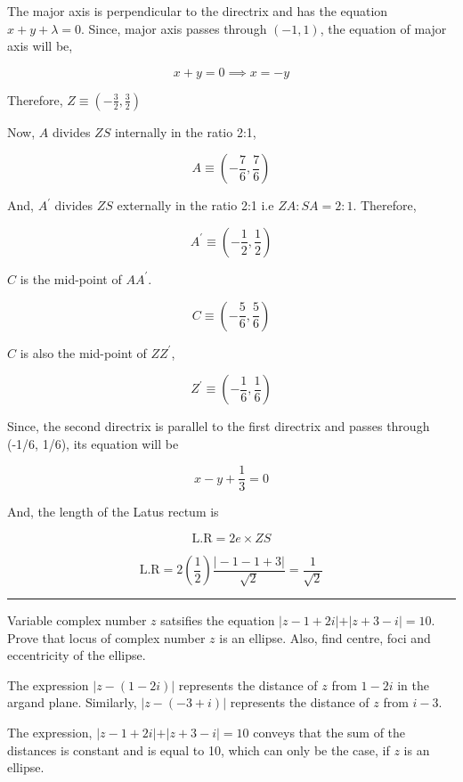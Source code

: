 \documentclass[twocolumn]{article}
\begin{document}
\begin{CJK*}{UTF8}{gbsn}
The major axis is perpendicular to the directrix and has the equation \(x+y+ \lambda = 0\). Since, major axis passes through \((-1,1)\), the equation of major axis will be, 

\[
    x+y = 0 \implies x = -y
\]

Therefore, \(Z  \equiv (-\frac{3}{2}, \frac{3}{2})\)

\vspace*{0.1in}

Now, \(A\) divides \(ZS\) internally in the ratio 2:1, 

\[
    A\equiv (-\frac{7}{6}, \frac{7}{6})
\]

And, \(A^{\prime}\) divides \(ZS\) externally in the ratio 2:1 i.e \(ZA : SA = 2:1\). Therefore, 

\[
    A^{\prime} \equiv (-\frac{1}{2}, \frac{1}{2})
\]

\(C\)  is the mid-point of \(A A^{\prime} \). 

\[
    C \equiv (-\frac{5}{6}, \frac{5}{6})
\]

\(C\) is also the mid-point of \(Z  Z^{\prime} \), 

\[
    Z^{\prime}  \equiv  (-\frac{1}{6}, \frac{1}{6})
\]

Since, the second directrix is parallel to the first directrix and passes through (-1/6, 1/6), its equation will be

\[
    x-y + \frac{1}{3} = 0
\]

And, the length of the Latus rectum is

\[
    \text{L.R} = 2e \times ZS
\]

\[
    \text{L.R} = 2 (\frac{1}{2}) \frac{\vert -1 -1 + 3 \vert }{\sqrt{2} } = \frac{1}{\sqrt{2} }
\]

\hrule 

\begin{question}
    Variable  complex number \(z\) satsifies the equation \(\vert z-1 + 2i \vert + \vert z + 3 - i \vert =  10\). Prove that locus of complex number \(z\) is an ellipse. Also, find centre, foci and eccentricity of the ellipse. 
\end{question}

The expression \(\vert z- (1 - 2i) \vert\) represents the distance of \(z\) from \(1-2i\) in the argand plane. Similarly, \(\vert z - (-3+i) \vert \) represents the distance of \(z\) from \(i-3\). 

\vspace*{0.1in}

The expression, \(\vert z-1+2i \vert + \vert z+3-i \vert = 10 \) conveys that the sum of the distances is constant and is equal to 10, which can only be the case, if \(z\) is an ellipse.  


\end{CJK*}
\end{document}
